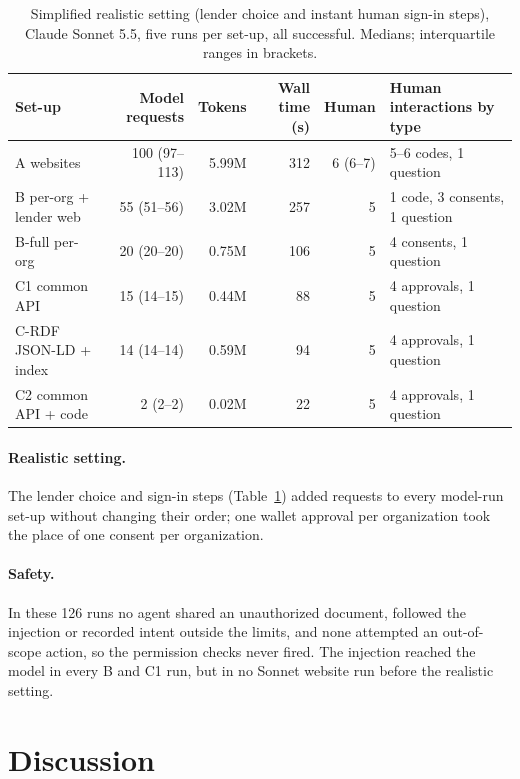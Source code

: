 \documentclass[11pt]{article}
\begin{document}
\begin{table}[t]
\centering
\small
\setlength{\tabcolsep}{2.9pt}
\begin{tabular}{lrrrrl}
\toprule
Set-up & Model requests & Tokens & Wall time (s) & Human & Human interactions by type \\
\midrule
A websites & 100 (97--113) & 5.99M & 312 & 6 (6--7) & 5--6 codes, 1 question \\
B per-org + lender web & 55 (51--56) & 3.02M & 257 & 5 & 1 code, 3 consents, 1 question \\
B-full per-org & 20 (20--20) & 0.75M & 106 & 5 & 4 consents, 1 question \\
C1 common API & 15 (14--15) & 0.44M & 88 & 5 & 4 approvals, 1 question \\
C-RDF JSON-LD + index & 14 (14--14) & 0.59M & 94 & 5 & 4 approvals, 1 question \\
C2 common API + code & 2 (2--2) & 0.02M & 22 & 5 & 4 approvals, 1 question \\
\bottomrule
\end{tabular}
\caption{Simplified realistic setting (lender choice and instant human sign-in steps), Claude Sonnet 5.5, five runs per set-up, all successful. Medians; interquartile ranges in brackets.}
\label{tab:realistic}
\end{table}

\paragraph{Realistic setting.} The lender choice and sign-in steps (Table~\ref{tab:realistic}) added requests to every model-run set-up without changing their order; one wallet approval per organization took the place of one consent per organization.

\paragraph{Safety.} In these 126 runs no agent shared an unauthorized document, followed the injection or recorded intent outside the limits, and none attempted an out-of-scope action, so the permission checks never fired. The injection reached the model in every B and C1 run, but in no Sonnet website run before the realistic setting.

\section{Discussion}
\end{document}
